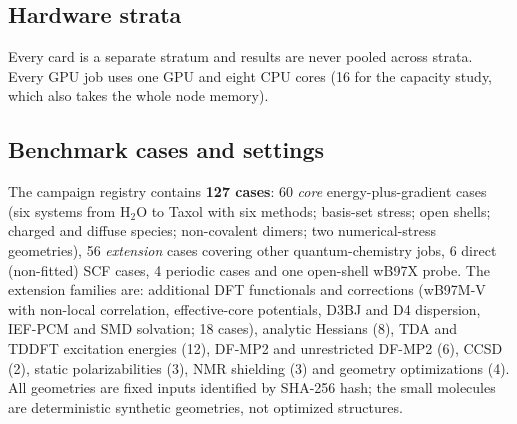 \subsection{Hardware strata}

Every card is a separate stratum and results are never pooled across strata. Every GPU job uses one GPU and eight CPU cores (16 for the capacity study, which also takes the whole node memory).

\begin{table}[!htbp]
\centering\small
{}
\caption{Hardware strata of the LCC cluster. All GPU nodes ran driver 550.54.14 (CUDA 12.4). The P100 cards have no tensor cores. The measured cuBLAS double-precision matrix-multiply ceiling (an $8192^3$ product) is 16.3~TFLOPS on the A100 and 6.8~TFLOPS on the V100.}
\label{tab:hardware}
\end{table}

\subsection{Benchmark cases and settings}

The campaign registry contains \textbf{127 cases}: 60 \emph{core} energy-plus-gradient cases (six systems from H$_2$O to Taxol with six methods; basis-set stress; open shells; charged and diffuse species; non-covalent dimers; two numerical-stress geometries), 56 \emph{extension} cases covering other quantum-chemistry jobs, 6 direct (non-fitted) SCF cases, 4 periodic cases and one open-shell wB97X probe. The extension families are: additional DFT functionals and corrections (wB97M-V with non-local correlation, effective-core potentials, D3BJ and D4 dispersion, IEF-PCM and SMD solvation; 18 cases), analytic Hessians (8), TDA and TDDFT excitation energies (12), DF-MP2 and unrestricted DF-MP2 (6), CCSD (2), static polarizabilities (3), NMR shielding (3) and geometry optimizations (4). All geometries are fixed inputs identified by SHA-256 hash; the small molecules are deterministic synthetic geometries, not optimized structures.

